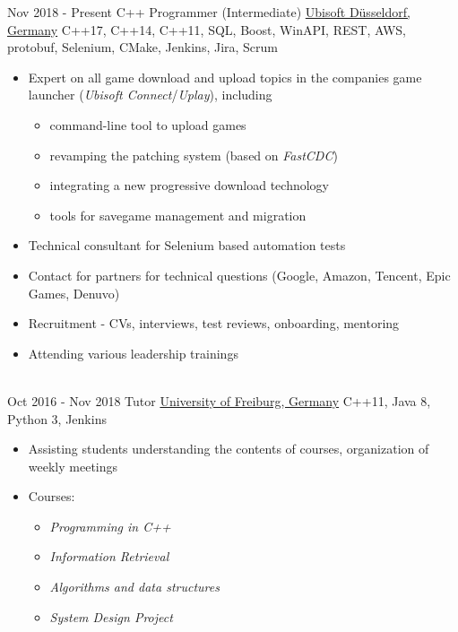 \documentclass[letterpaper]{twentysecondcv} %
\begin{document}
\begin{twenty} %
     	\twentyitem
    		{Nov 2018 -}
		{Present}
        		{C++ Programmer (Intermediate)}
        		{\href{https://duesseldorf.ubisoft.com/en}{Ubisoft Düsseldorf, Germany}}
        		{C++17, C++14, C++11, SQL, Boost, WinAPI, REST, AWS, protobuf, Selenium, CMake, Jenkins, Jira, Scrum}
        		{\begin{itemize}
        			\item Expert on all game download and upload topics in the companies game launcher (\textit{Ubisoft Connect}/\textit{Uplay}), including
        			\begin{itemize}
        				\item command-line tool to upload games
        				\item revamping the patching system (based on \textit{FastCDC})
        				\item integrating a new progressive download technology
        				\item tools for savegame management and migration
        			\end{itemize}
        			\item Technical consultant for Selenium based automation tests
        			\item Contact for partners for technical questions (Google, Amazon, Tencent, Epic Games, Denuvo)
        			\item Recruitment - CVs, interviews, test reviews, onboarding, mentoring
        			\item Attending various leadership trainings
        		\end{itemize}}\\
     	\twentyitem
    		{Oct 2016 -}
		{Nov 2018}
        		{Tutor}
        		{\href{https://www.uni-freiburg.de/}{University of Freiburg, Germany}}
        		{C++11, Java 8, Python 3, Jenkins}
        		{\begin{itemize}
        			\item Assisting students understanding the contents of courses, organization of weekly meetings
        			\item Courses:
        			\begin{itemize}
        				\item \textit{Programming in C++}
        				\item \textit{Information Retrieval}
        				\item \textit{Algorithms and data structures}
        				\item \textit{System Design Project}

\end{itemize}
\end{itemize}}
\end{twenty}
\end{document}
